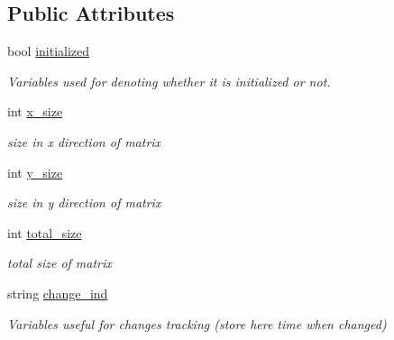 \subsection*{Public Attributes}
\begin{DoxyCompactItemize}
\item 
\hypertarget{class_calculation_matrix_aad5b8d4d42d7974d6881f0f8710116d2}{}bool \hyperlink{class_calculation_matrix_aad5b8d4d42d7974d6881f0f8710116d2}{initialized}\label{class_calculation_matrix_aad5b8d4d42d7974d6881f0f8710116d2}

\begin{DoxyCompactList}\small\item\em Variables used for denoting whether it is initialized or not. \end{DoxyCompactList}\item 
\hypertarget{class_calculation_matrix_a9642a6f67e1496daf140e3fc040ccf1d}{}int \hyperlink{class_calculation_matrix_a9642a6f67e1496daf140e3fc040ccf1d}{x\+\_\+size}\label{class_calculation_matrix_a9642a6f67e1496daf140e3fc040ccf1d}

\begin{DoxyCompactList}\small\item\em size in x direction of matrix \end{DoxyCompactList}\item 
\hypertarget{class_calculation_matrix_ab8c74f28c4dcb16db84c049041d92dcb}{}int \hyperlink{class_calculation_matrix_ab8c74f28c4dcb16db84c049041d92dcb}{y\+\_\+size}\label{class_calculation_matrix_ab8c74f28c4dcb16db84c049041d92dcb}

\begin{DoxyCompactList}\small\item\em size in y direction of matrix \end{DoxyCompactList}\item 
\hypertarget{class_calculation_matrix_a41b3fa83425168befdf6ff2ea3cb365a}{}int \hyperlink{class_calculation_matrix_a41b3fa83425168befdf6ff2ea3cb365a}{total\+\_\+size}\label{class_calculation_matrix_a41b3fa83425168befdf6ff2ea3cb365a}

\begin{DoxyCompactList}\small\item\em total size of matrix \end{DoxyCompactList}\item 
\hypertarget{class_calculation_matrix_afec1f2436aef138ed79e25220cf89f93}{}string \hyperlink{class_calculation_matrix_afec1f2436aef138ed79e25220cf89f93}{change\+\_\+ind}\label{class_calculation_matrix_afec1f2436aef138ed79e25220cf89f93}

\begin{DoxyCompactList}\small\item\em Variables useful for changes tracking (store here time when changed) \end{DoxyCompactList}\end{DoxyCompactItemize}


